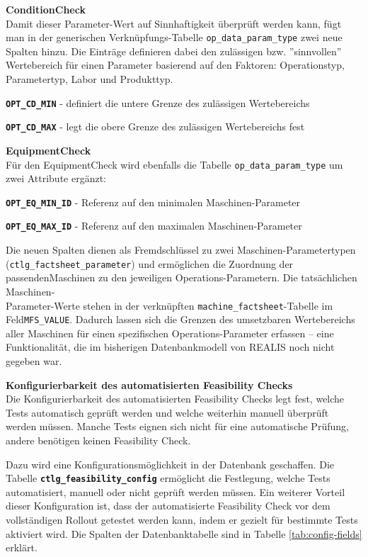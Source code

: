 \textbf{\gls{ConditionCheck}} \\
Damit dieser Parameter-Wert auf Sinnhaftigkeit überprüft werden kann, fügt man in der generischen Verknüpfungs-Tabelle \texttt{op\_data\_param\_type} zwei neue Spalten hinzu. Die Einträge definieren dabei den zulässigen bzw. ''sinnvollen'' Wertebereich für einen Parameter basierend auf den Faktoren: Operationstyp, Parametertyp, Labor und Produkttyp.

\setlength{\leftskip}{1em} 
\textbf{\texttt{OPT\_CD\_MIN}} - definiert die untere Grenze des zulässigen Wertebereichs

\textbf{\texttt{OPT\_CD\_MAX}} - legt die obere Grenze des zulässigen Wertebereichs fest

\setlength{\leftskip}{0em} 

\textbf{\gls{EquipmentCheck}} \\
Für den \gls{EquipmentCheck} wird ebenfalls die Tabelle \texttt{op\_data\_param\_type} um zwei Attribute ergänzt:

\setlength{\leftskip}{1em} 
\textbf{\texttt{OPT\_EQ\_MIN\_ID}} - Referenz auf den minimalen Maschinen-Parameter

\textbf{\texttt{OPT\_EQ\_MAX\_ID}} - Referenz auf den maximalen Maschinen-Parameter

\setlength{\leftskip}{0em} 

Die neuen Spalten dienen als Fremdschlüssel zu zwei Maschinen-Parametertypen (\texttt{ctlg\_factsheet\_parameter}) und ermöglichen die Zuordnung der passenden\linebreak Maschinen zu den jeweiligen Operations-Parametern. Die tatsächlichen Maschinen-\\Parameter-Werte stehen in der verknüpften \texttt{machine\_factsheet}-Tabelle im Feld\linebreak \texttt{MFS\-\_VALUE}. Dadurch lassen sich die Grenzen des umsetzbaren Wertebereichs aller Maschinen für einen spezifischen Operations-Parameter erfassen – eine Funktionalität, die im bisherigen Datenbankmodell von REALIS noch nicht gegeben war.


\textbf{Konfigurierbarkeit des automatisierten Feasibility Checks} \\
Die Konfigurierbarkeit des automatisierten Feasibility Checks legt fest, welche Tests automatisch geprüft werden und welche weiterhin manuell überprüft werden müssen. Manche Tests eignen sich nicht für eine automatische Prüfung, andere benötigen keinen Feasibility Check.

 Dazu wird eine Konfigurationsmöglichkeit in der Datenbank geschaffen. Die Tabelle \textbf{\texttt{ctlg\_feasibility\_config}} ermöglicht die Festlegung, welche Tests automatisiert, manuell oder nicht geprüft werden müssen. Ein weiterer Vorteil dieser Konfiguration ist, dass der automatisierte Feasibility Check vor dem vollständigen Rollout getestet werden kann, indem er gezielt für bestimmte Tests aktiviert wird. Die Spalten der Datenbanktabelle sind in Tabelle \ref{tab:config-fields} erklärt.

